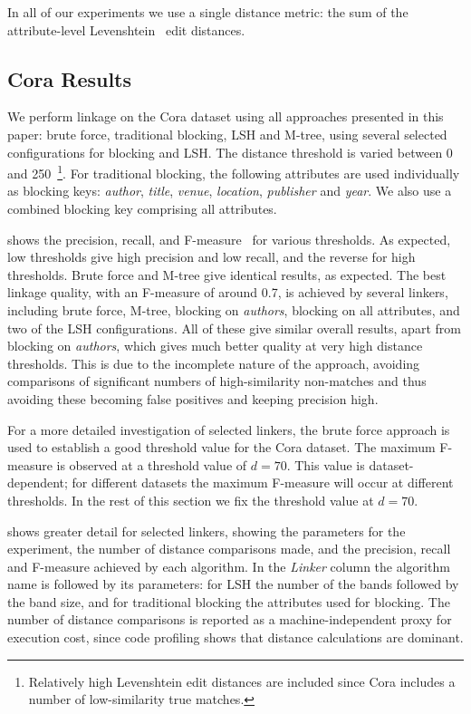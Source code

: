 \documentclass{llncs}
\begin{document}
In all of our experiments we use a single distance metric: the
sum of the attribute-level Levenshtein~\cite{Levenshtein66} edit distances.

\subsection{Cora Results}

We perform linkage on the Cora dataset using all
approaches presented in this paper: brute force, traditional blocking,
LSH and M-tree, using several selected configurations for blocking
and LSH. The distance threshold is varied between 0 and 250~\footnote{Relatively high Levenshtein edit distances are
included since Cora includes a number of low-similarity true
matches.}. For traditional blocking, the following attributes are
used individually as blocking keys: \emph{author}, \emph{title},
\emph{venue}, \emph{location}, \emph{publisher} and \emph{year}. We
also use a combined blocking key comprising all attributes.

 shows the precision, recall, and
F-measure~\cite{Chr12} for various thresholds. As expected, low
thresholds give high precision and low recall, and the reverse for high
thresholds. Brute force and M-tree give identical results, as
expected. The best linkage quality, with an F-measure of around 0.7, is
achieved by several linkers, including brute force, M-tree, blocking
on \emph{authors}, blocking on all attributes, and two of the LSH
configurations. All of these give similar overall results, apart from
blocking on \emph{authors}, which gives much better quality at very high
distance thresholds. This is due to the incomplete nature of the
approach, avoiding comparisons of significant numbers of high-similarity
non-matches and thus avoiding these becoming false positives and keeping
precision high.

For a more detailed investigation of selected linkers, the brute force
approach is used to establish a good threshold value for the Cora
dataset. The maximum F-measure is observed at a threshold value of
$d=70$. This value is dataset-dependent; for different datasets the
maximum F-measure will occur at different thresholds. In the rest of
this section we fix the threshold value at $d=70$.

 shows greater detail for selected
linkers, showing the parameters for the experiment, the number of
distance comparisons made, and the precision, recall and F-measure
achieved by each algorithm. In the \emph{Linker} column the algorithm
name is followed by its parameters: for LSH the number of the bands
followed by the band size, and for traditional blocking the attributes
used for blocking. The number of distance comparisons is reported as a
machine-independent proxy for execution cost, since code profiling
shows that distance calculations are dominant.
\end{document}
